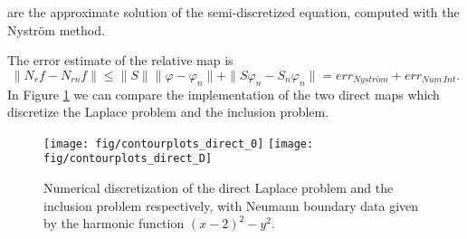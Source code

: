 \documentclass[10pt, a4paper, twoside, openright]{book}
\theoremstyle{definition}
\theoremstyle{plain}
\theoremstyle{plain}
\theoremstyle{plain}
\theoremstyle{plain}
\theoremstyle{plain}
\theoremstyle{plain}
\theoremstyle{plain}
\theoremstyle{plain}
\let\phi\varphi
\begin{document}
are the approximate solution of the semi-discretized equation, computed with the Nystr\"{o}m method.
\par
The error estimate of the relative map is
\begin{equation}
 \|{N_r}f - {N_{rn}}f\|\leq\|S\|\|\phi-\phi_n\| + \|S\phi_n - S_n\phi_n\| = err_{Nystr\textit{\"{o}}m} + err_{Num\,Int}.
\end{equation}
In Figure \ref{fig:contourplots_direct} we can compare the implementation of the two 
direct maps which discretize the Laplace problem and the inclusion problem.

\begin{center}
\begin{figure}
{
\texttt{[image: fig/contourplots\_direct\_0]}
}
{
\texttt{[image: fig/contourplots\_direct\_D]}
}
\caption{Numerical discretization of the direct Laplace problem and the inclusion problem respectively,
with Neumann boundary data given by the harmonic function $(x-2)^2-y^2$.}
\label{fig:contourplots_direct}
\end{figure}
\end{center}
\end{document}

